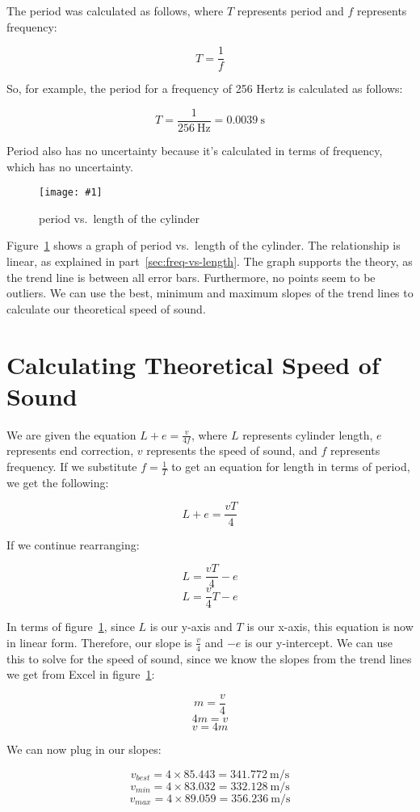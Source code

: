\documentclass{article}
\newcommand{\graph}[2]{
  \begin{figure}[H]
    \medskip
    \centering
    \texttt{[image: \#1]}
    \caption{#2}
    \medskip\label{fig:#1}
  \end{figure}
}
\begin{document}
The period was calculated as follows, where \(T\) represents period and \(f\)
represents frequency:

\[T=\frac{1}{f}\]

So, for example, the period for a frequency of 256 Hertz is
calculated as follows:

\[T=\frac{1}{\SI{256}{\hertz}}=\SI{0.0039}{\second}\]

Period also has no uncertainty because it's calculated in terms of
frequency, which has no uncertainty.

\graph{period-vs-length}{period vs.\ length of the cylinder}

Figure~\ref{fig:period-vs-length} shows a graph of period vs.\ length
of the cylinder. The relationship is linear, as explained in
part~\ref{sec:freq-vs-length}. The graph supports the theory, as the
trend line is between all error bars. Furthermore, no points seem to
be outliers. We can use the best, minimum and maximum slopes of the
trend lines to calculate our theoretical speed of sound.

\section{Calculating Theoretical Speed of Sound}\label{sec:theoretical-speed}

We are given the equation \(L+e=\frac{v}{4f}\), where \(L\) represents cylinder
length, \(e\) represents end correction, \(v\) represents the speed of sound,
and \(f\) represents frequency. If we substitute \(f=\frac{1}{T}\) to get
an equation for length in terms of period, we get the following:

\[L+e=\frac{vT}{4}\]

If we continue rearranging:

\[L=\frac{vT}{4}-e\]
\[L=\frac{v}{4}T-e\]

In terms of figure~\ref{fig:period-vs-length}, since \(L\) is our
y-axis and \(T\) is our x-axis, this equation is now in linear form.
Therefore, our slope is \(\frac{v}{4}\) and \(-e\) is our
y-intercept. We can use this to solve for the speed of sound, since
we know the slopes from the trend lines we get from Excel in
figure~\ref{fig:period-vs-length}:

\[m=\frac{v}{4}\]
\[4m=v\]
\[v=4m\]

We can now plug in our slopes:

\[v_{best}=4\times85.443=\SI{341.772}{\metre\per\second}\]
\[v_{min}=4\times83.032=\SI{332.128}{\metre\per\second}\]
\[v_{max}=4\times89.059=\SI{356.236}{\metre\per\second}\]
\end{document}
